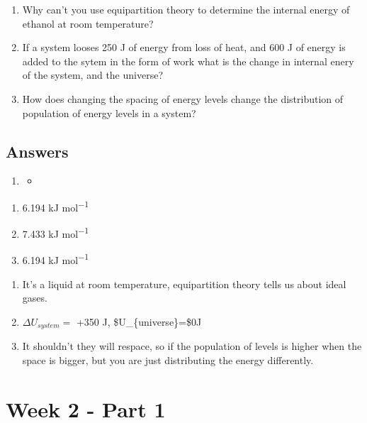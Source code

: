 \documentclass[
]{book}
\providecommand{\tightlist}{%
  \setlength{\itemsep}{0pt}\setlength{\parskip}{0pt}}
\begin{document}
\begin{enumerate}
\def\labelenumi{\arabic{enumi}.}
\setcounter{enumi}{1}
\item
  Why can't you use equipartition theory to determine the internal energy of ethanol at room temperature?
\item
  If a system looses 250 J of energy from loss of heat, and 600 J of energy is added to the sytem in the form of work what is the change in internal enery of the system, and the universe?
\item
  How does changing the spacing of energy levels change the distribution of population of energy levels in a system?
\end{enumerate}

\hypertarget{answers}{%
\section{Answers}\label{answers}}

\begin{enumerate}
\def\labelenumi{\arabic{enumi}.}
\item
  \begin{itemize}
  \item
  \end{itemize}
\end{enumerate}

\begin{enumerate}
\def\labelenumi{\alph{enumi}.}
\tightlist
\item
  6.194 kJ mol\textsuperscript{−1}
\item
  7.433 kJ mol\textsuperscript{−1}
\item
  6.194 kJ mol\textsuperscript{−1}
\end{enumerate}

\begin{enumerate}
\def\labelenumi{\arabic{enumi}.}
\setcounter{enumi}{1}
\item
  It's a liquid at room temperature, equipartition theory tells us about ideal gases.
\item
  \(\Delta U_{system}=\) +350 J, \$\Delta U\_\{universe\}=\$0J
\item
  It shouldn't they will respace, so if the population of levels is higher when the space is bigger, but you are just distributing the energy differently.
\end{enumerate}

\hypertarget{ch:Part3}{%
\chapter{Week 2 - Part 1}\label{ch:Part3}}
\end{document}
